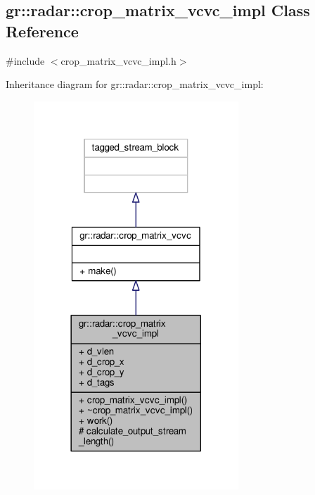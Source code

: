 \subsection{gr\+:\+:radar\+:\+:crop\+\_\+matrix\+\_\+vcvc\+\_\+impl Class Reference}
\label{classgr_1_1radar_1_1crop__matrix__vcvc__impl}


{\ttfamily \#include $<$crop\+\_\+matrix\+\_\+vcvc\+\_\+impl.\+h$>$}



Inheritance diagram for gr\+:\+:radar\+:\+:crop\+\_\+matrix\+\_\+vcvc\+\_\+impl\+:
\nopagebreak
\begin{figure}[H]
\begin{center}
\leavevmode
\includegraphics[width=218pt]{dc/d05/classgr_1_1radar_1_1crop__matrix__vcvc__impl__inherit__graph}
\end{center}
\end{figure}


